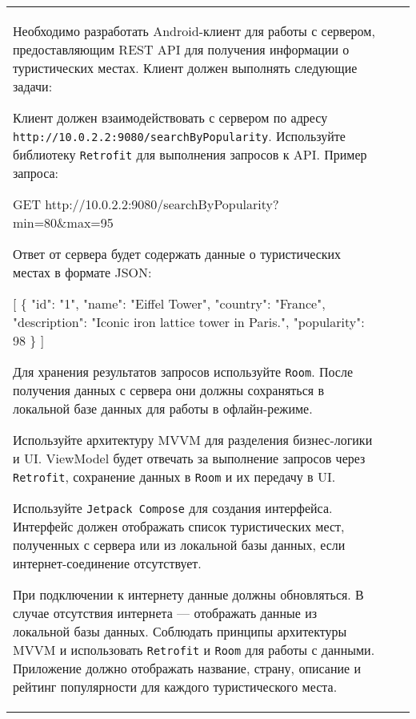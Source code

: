 \documentclass[a4paper]{article}
\begin{document}
\begin{tabular}{!{\vrule width 2pt}p{5cm}|p{6cm}|p{4cm}!{\vrule width 2pt}}
{\begin{minipage}{16cm}
\begin{enumerate}
Необходимо разработать Android-клиент для работы с сервером, предоставляющим REST API для получения информации о туристических местах. Клиент должен выполнять следующие задачи:

Клиент должен взаимодействовать с сервером по адресу \texttt{http://10.0.2.2:9080/searchByPopularity}. Используйте библиотеку \texttt{Retrofit} для выполнения запросов к API. Пример запроса:


GET http://10.0.2.2:9080/searchByPopularity?min=80\&max=95


Ответ от сервера будет содержать данные о туристических местах в формате JSON:


[
  \{
    "id": "1",
    "name": "Eiffel Tower",
    "country": "France",
    "description": "Iconic iron lattice tower in Paris.",
    "popularity": 98
  \}
]


Для хранения результатов запросов используйте \texttt{Room}. После получения данных с сервера они должны сохраняться в локальной базе данных для работы в офлайн-режиме.

Используйте архитектуру MVVM для разделения бизнес-логики и UI. ViewModel будет отвечать за выполнение запросов через \texttt{Retrofit}, сохранение данных в \texttt{Room} и их передачу в UI.

Используйте \texttt{Jetpack Compose} для создания интерфейса. Интерфейс должен отображать список туристических мест, полученных с сервера или из локальной базы данных, если интернет-соединение отсутствует.

При подключении к интернету данные должны обновляться.
В случае отсутствия интернета — отображать данные из локальной базы данных.
Соблюдать принципы архитектуры MVVM и использовать \texttt{Retrofit} и \texttt{Room} для работы с данными.
Приложение должно отображать название, страну, описание и рейтинг популярности для каждого туристического места. 
\end{enumerate}


\end{minipage}}
\end{tabular}
\end{document}
